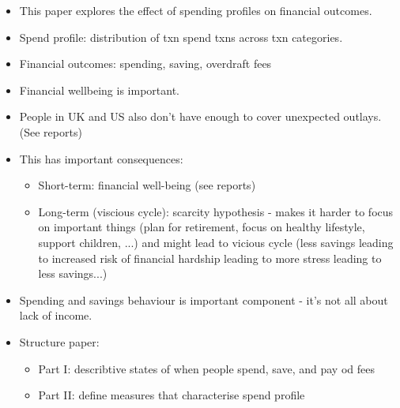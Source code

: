 \begin{itemize}


    \item This paper explores the effect of spending profiles on financial
        outcomes.

    \item Spend profile: distribution of txn spend txns across txn categories.

    \item Financial outcomes: spending, saving, overdraft fees


    \item Financial wellbeing is important.

    \item People in UK and US also don't have enough to cover unexpected
        outlays. (See reports)

    \item This has important consequences:

        \begin{itemize}

            \item Short-term: financial well-being (see reports)

            \item Long-term (viscious cycle): scarcity hypothesis - makes it
                harder to focus on important things (plan for retirement, focus
                on healthy lifestyle, support children, ...) and might lead to
                vicious cycle (less savings leading to increased risk of
                financial hardship leading to more stress leading to less
                savings...)

        \end{itemize}

    \item Spending and savings behaviour is important component - it's not all
        about lack of income.

    \item Structure paper:

        \begin{itemize}

            \item Part I: describtive states of when people spend, save, and pay od fees

            \item Part II: define measures that characterise spend profile


\end{itemize}
\end{itemize}
